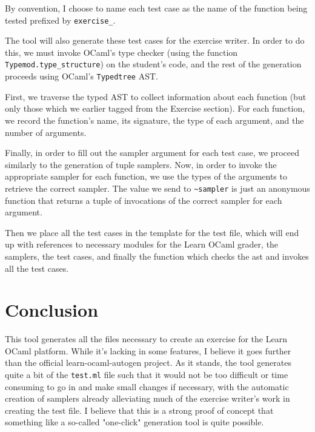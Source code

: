 \documentclass[11pt]{article}
\begin{document}
By convention, I choose to name each test case as the name of the function being tested prefixed by \verb+exercise_+. 

The tool will also generate these test cases for the exercise writer. In order to do this, we must invoke OCaml's type checker (using the function \verb+Typemod.type_structure+) on the student's code, and the rest of the generation proceeds using OCaml's \verb+Typedtree+ AST.

First, we traverse the typed AST to collect information about each function (but only those which we earlier tagged from the Exercise section). For each function, we record the function's name, its signature, the type of each argument, and the number of arguments.

Finally, in order to fill out the sampler argument for each test case, we proceed similarly to the generation of tuple samplers. Now, in order to invoke the appropriate sampler for each function, we use the types of the arguments to retrieve the correct sampler. The value we send to \verb+~sampler+ is just an anonymous function that returns a tuple of invocations of the correct sampler for each argument.

Then we place all the test cases in the template for the test file, which will end up with references to necessary modules for the Learn OCaml grader, the samplers, the test cases, and finally the function which checks the ast and invokes all the test cases.

\section{Conclusion}
This tool generates all the files necessary to create an exercise for the Learn OCaml platform. While it's lacking in some features, I believe it goes further than the official learn-ocaml-autogen project. As it stands, the tool generates quite a bit of the \verb+test.ml+ file such that it would not be too difficult or time consuming to go in and make small changes if necessary, with the automatic creation of samplers already alleviating much of the exercise writer's work in creating the test file. I believe that this is a strong proof of concept that something like a so-called "one-click" generation tool is quite possible.
\end{document}
